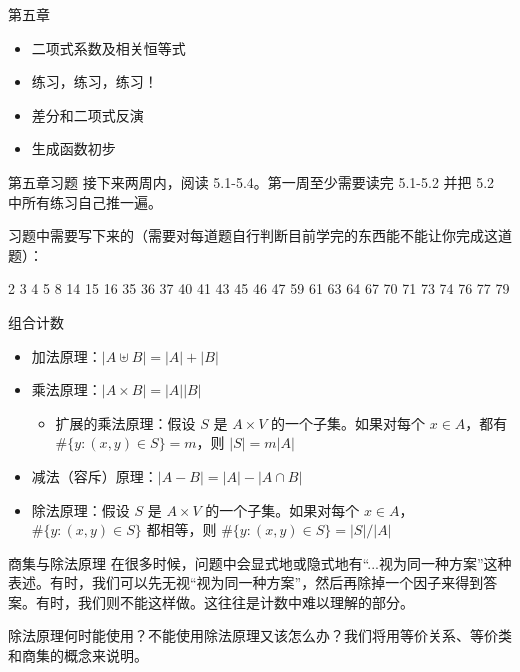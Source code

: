 
\begin{frame}{第五章}
    \begin{itemize}
        \item 二项式系数及相关恒等式
        \item 练习，练习，练习！
        \item 差分和二项式反演
        \item 生成函数初步
    \end{itemize}
\end{frame}
\begin{frame}{第五章习题}
    接下来两周内，阅读 5.1-5.4。第一周至少需要读完 5.1-5.2 并把 5.2 中所有练习自己推一遍。
    
    习题中需要写下来的（需要对每道题自行判断目前学完的东西能不能让你完成这道题）：
    
    2 3 4 5 8 14 15 16 35 36 37 40 41 43 45 46 47 59 61 63 64 67 70 71 73 74 76 77 79
\end{frame}
\begin{frame}{组合计数}
    \begin{itemize}
        \item 加法原理：$|A\uplus B|=|A|+|B|$
        \item 乘法原理：$|A\times B|=|A||B|$
        \begin{itemize}
            \item 扩展的乘法原理：假设 $S$ 是 $A\times V$ 的一个子集。如果对每个 $x\in A$，都有 $\#\{y:(x,y)\in S\}=m$，则 $|S|=m|A|$
        \end{itemize}
        \item 减法（容斥）原理：$|A-B|=|A|-|A\cap B|$
        \item 除法原理：假设 $S$ 是 $A\times V$ 的一个子集。如果对每个 $x\in A$，$\#\{y:(x,y)\in S\}$ 都相等，则 $\#\{y:(x,y)\in S\}=|S|/|A|$
    \end{itemize}
\end{frame}
\begin{frame}{商集与除法原理}
    在很多时候，问题中会显式地或隐式地有“...视为同一种方案”这种表述。有时，我们可以先无视“视为同一种方案”，然后再除掉一个因子来得到答案。有时，我们则不能这样做。这往往是计数中难以理解的部分。
    
    除法原理何时能使用？不能使用除法原理又该怎么办？我们将用等价关系、等价类和商集的概念来说明。
\end{frame}
